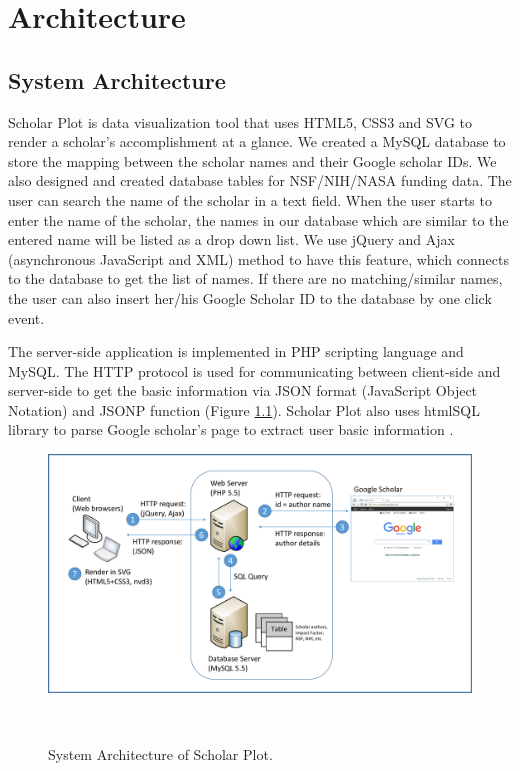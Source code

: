 \chapter{Architecture}\label{chap:Algorithms}
\section{System Architecture}
Scholar Plot is data visualization tool that uses HTML5, CSS3 and SVG to render a scholar's accomplishment at a glance. We created a MySQL database to store the mapping between the scholar names and their Google scholar IDs. We also designed and created database tables for NSF/NIH/NASA funding data. The user can search the name of the scholar in a text field. When the user starts to enter the name of the scholar, the names in our database which are similar to the entered name will be listed as a drop down list. We use jQuery and Ajax (asynchronous JavaScript and XML) method to have this feature, which connects to the database to get the list of names. If there are no matching/similar names, the user can also insert her/his Google Scholar ID to the database by one click event.

The server-side application is implemented in PHP scripting language and MySQL. The HTTP protocol is used for communicating between client-side and server-side to get the basic information via JSON format (JavaScript Object Notation) and JSONP function (Figure \ref{fig:fig-arch}). Scholar Plot also uses htmlSQL library to parse Google scholar's page to extract user basic information \cite{htmlSQL}.

\begin{figure}
\centering
  \includegraphics[width=1\columnwidth]{figures/fig_system_architecture.pdf}
  \caption{System Architecture of Scholar Plot.}~\label{fig:fig-arch}
\end{figure}

